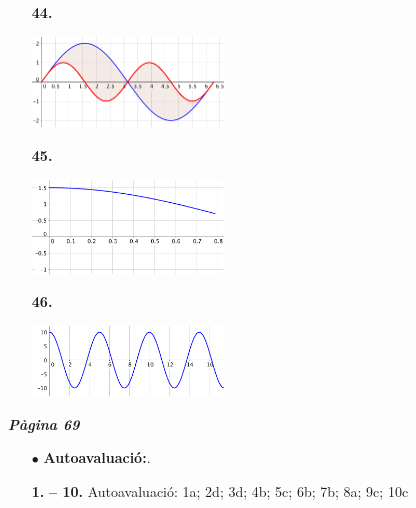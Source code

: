 \documentclass[a4paper, pdf, twoside]{book}
\begin{document}
\begin{multicols}{2}
\begin{enumerate}
\item[\fontfamily{phv}\selectfont\color{blue}\textbf{44. }] 
\mbox {}\par \includegraphics [width=0.4\textwidth ]{img-sol/t5-44}
\vspace{0.25cm}
\item[\fontfamily{phv}\selectfont\color{blue}\textbf{45. }] 
\mbox {}\par \includegraphics [width=0.4\textwidth ]{img-sol/t5-45}
\vspace{0.25cm}
\item[\fontfamily{phv}\selectfont\color{blue}\textbf{46. }] 
\mbox {}\par \includegraphics [width=0.4\textwidth ]{img-sol/t5-46}
 \end{enumerate}
\vspace{0.3cm}


{\textbf{\em Pàgina 69}} \hrulefill
\begin{enumerate}
\vspace{0.25cm}
 \item[$\bullet$ ] {\selectfont\color{blue}\textbf{Autoavaluació:}. }

 \end{enumerate}
\begin{enumerate}
\vspace{0.25cm}
\item[\fontfamily{phv}\selectfont\color{blue}\textbf{1. }]  \scalebox{0.6}{\simbolclau } 
\textbf {-- 10.} Autoavaluació: 1a; 2d; 3d; 4b; 5c; 6b; 7b; 8a; 9c; 10c
 \end{enumerate}
\vfill\null
\columnbreak
\def\currentname{Solucions del Tema 6}
\vspace*{0.75cm}


\end{multicols}
\end{document}
